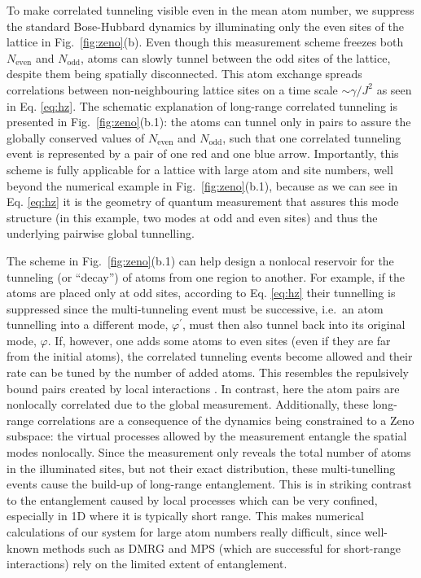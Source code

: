 To make correlated tunneling visible even in the mean atom number, we
suppress the standard Bose-Hubbard dynamics by illuminating only the
even sites of the lattice in Fig.~\ref{fig:zeno}(b). Even though this
measurement scheme freezes both $N_\text{even}$ and $N_\text{odd}$,
atoms can slowly tunnel between the odd sites of the lattice, despite
them being spatially disconnected. This atom exchange spreads
correlations between non-neighbouring lattice sites on a time scale
$\sim \gamma/J^2$ as seen in Eq. \eqref{eq:hz}. The schematic
explanation of long-range correlated tunneling is presented in
Fig.~\ref{fig:zeno}(b.1): the atoms can tunnel only in pairs to assure
the globally conserved values of $N_\text{even}$ and $N_\text{odd}$,
such that one correlated tunneling event is represented by a pair of
one red and one blue arrow. Importantly, this scheme is fully
applicable for a lattice with large atom and site numbers, well beyond
the numerical example in Fig.~\ref{fig:zeno}(b.1), because as we can
see in Eq. \eqref{eq:hz} it is the geometry of quantum measurement that
assures this mode structure (in this example, two modes at odd and
even sites) and thus the underlying pairwise global tunnelling.

The scheme in Fig.~\ref{fig:zeno}(b.1) can help design a nonlocal
reservoir for the tunneling (or ``decay'') of atoms from one region to
another. For example, if the atoms are placed only at odd sites,
according to Eq. \eqref{eq:hz} their tunnelling is suppressed since the
multi-tunneling event must be successive, i.e.~an atom tunnelling into
a different mode, $\varphi^\prime$, must then also tunnel back into
its original mode, $\varphi$. If, however, one adds some atoms to even
sites (even if they are far from the initial atoms), the correlated
tunneling events become allowed and their rate can be tuned by the
number of added atoms. This resembles the repulsively bound pairs
created by local interactions \cite{winkler2006, folling2007}. In
contrast, here the atom pairs are nonlocally correlated due to the
global measurement. Additionally, these long-range correlations are a
consequence of the dynamics being constrained to a Zeno subspace: the
virtual processes allowed by the measurement entangle the spatial
modes nonlocally. Since the measurement only reveals the total number
of atoms in the illuminated sites, but not their exact distribution,
these multi-tunelling events cause the build-up of long-range
entanglement. This is in striking contrast to the entanglement caused
by local processes which can be very confined, especially in 1D where
it is typically short range. This makes numerical calculations of our
system for large atom numbers really difficult, since well-known
methods such as DMRG and MPS \cite{schollwock2005} (which are
successful for short-range interactions) rely on the limited extent of
entanglement.

